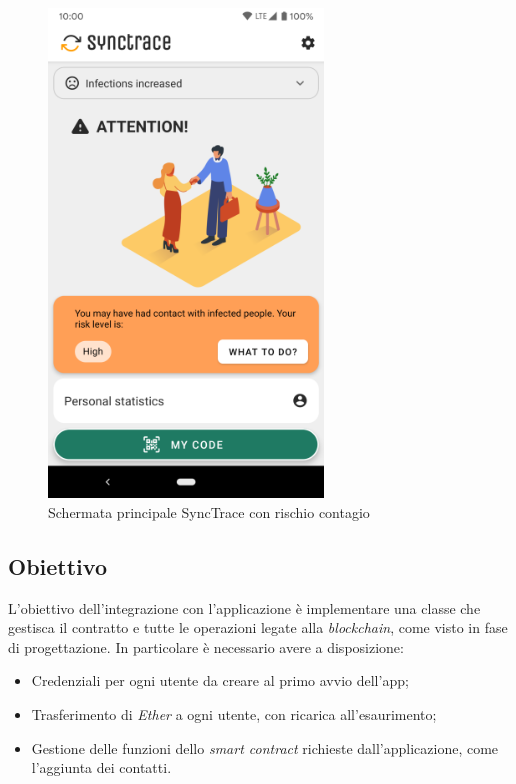 \begin{figure}[!htb]
\begin{minipage}{0.48\textwidth}
     \centering
     \includegraphics[width=0.65\textwidth]{./immagini/appinfection}
     \caption{Schermata principale SyncTrace con rischio contagio}
   \end{minipage}
\end{figure}
\FloatBarrier
\subsection{Obiettivo}
L'obiettivo dell'integrazione con l'applicazione è implementare una classe che gestisca il contratto e tutte le operazioni legate alla \textit{blockchain}, come visto in fase di progettazione. In particolare è necessario avere a disposizione:
\begin{itemize}
	\item{Credenziali per ogni utente da creare al primo avvio dell'app;}
	\item{Trasferimento di \textit{Ether} a ogni utente, con ricarica all'esaurimento;}
	\item{Gestione delle funzioni dello \textit{smart contract} richieste dall'applicazione, come l'aggiunta dei contatti.}
\end{itemize}

